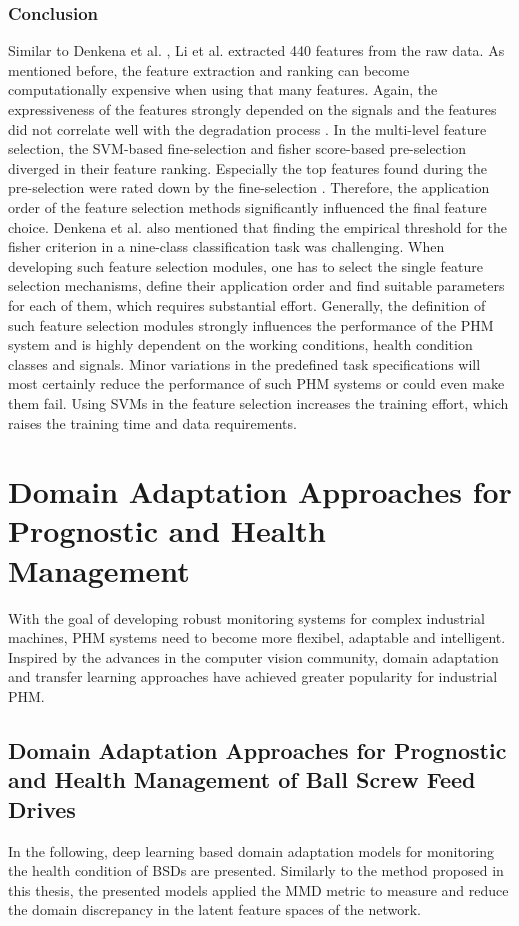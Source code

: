 \subsubsection{Conclusion}
Similar to Denkena et al. \cite{Denkena2021}, Li et al. \cite{LiPin2018} extracted 440 features from the raw data. As mentioned before, the feature extraction and ranking can become computationally expensive when using that many features. Again, the expressiveness of the features strongly depended on the signals and the features did not correlate well with the degradation process \cite{LiPin2018}. In the multi-level feature selection, the SVM-based fine-selection and fisher score-based pre-selection diverged in their feature ranking. Especially the top features found during the pre-selection were rated down by the fine-selection \cite{LiPin2018}. Therefore, the application order of the feature selection methods significantly influenced the final feature choice. Denkena et al. \cite{Denkena2021} also mentioned that finding the empirical threshold for the fisher criterion in a nine-class classification task was challenging. When developing such feature selection modules, one has to select the single feature selection mechanisms, define their application order and find suitable parameters for each of them, which requires substantial effort. Generally, the definition of such feature selection modules strongly influences the performance of the PHM system and is highly dependent on the working conditions, health condition classes and signals. Minor variations in the predefined task specifications will most certainly reduce the performance of such PHM systems or could even make them fail. Using SVMs in the feature selection increases the training effort, which raises the training time and data requirements.

\newpage

\section{Domain Adaptation Approaches for Prognostic and Health Management} \label{sec:domain_adaption_approach}
With the goal of developing robust monitoring systems for complex industrial machines, PHM systems need to become more flexibel, adaptable and intelligent. Inspired by the advances in the computer vision community, domain adaptation and transfer learning approaches have achieved greater popularity for industrial PHM. 

\subsection{Domain Adaptation Approaches for Prognostic and Health Management of Ball Screw Feed Drives}
In the following, deep learning based domain adaptation models for monitoring the health condition of BSDs are presented. Similarly to the method proposed in this thesis, the presented models applied the MMD metric to measure and reduce the domain discrepancy in the latent feature spaces of the network.


